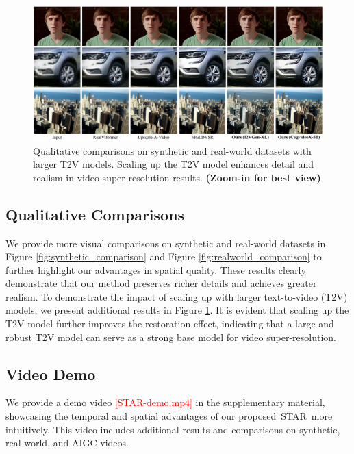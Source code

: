 \documentclass[10pt,twocolumn,letterpaper,table]{article}
\newcommand{\name}{STAR}
\begin{document}
\begin{figure}
    \centering
    \includegraphics[width=1\linewidth]{figure_of_supp/scale_up.pdf}
    \caption{Qualitative comparisons on synthetic and real-world datasets with larger T2V models. Scaling up the T2V model enhances detail and realism in video super-resolution results. \textbf{(Zoom-in for best view)}}
    \label{fig:scale_up}
\end{figure}

\subsection{Qualitative Comparisons}
We provide more visual comparisons on synthetic and real-world datasets in Figure \ref{fig:synthetic_comparison} and Figure \ref{fig:realworld_comparison} to further highlight our advantages in spatial quality. These results clearly demonstrate that our method preserves richer details and achieves greater realism.
To demonstrate the impact of scaling up with larger text-to-video (T2V) models, we present additional results in Figure \ref{fig:scale_up}. It is evident that scaling up the T2V model further improves the restoration effect, indicating that a large and robust T2V model can serve as a strong base model for video super-resolution.


\subsection{Video Demo}
We provide a demo video \href{https://youtu.be/hx0zrql-SrU}{\textcolor{red}{[STAR-demo.mp4]}} in the supplementary material, showcasing the temporal and spatial advantages of our proposed~\name~more intuitively. This video includes additional results and comparisons on synthetic, real-world, and AIGC videos.
\end{document}
